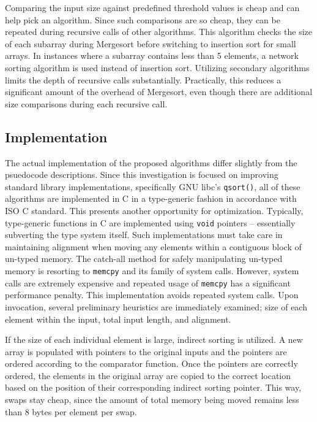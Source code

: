 \documentclass[12pt, conference]{ieeeconf}
\begin{document}
Comparing the input size against predefined threshold values is cheap and can
help pick an algorithm. Since such comparisons are so cheap, they can be
repeated during recursive calls of other algorithms. This algorithm checks the
size of each subarray during Mergesort before switching to insertion sort for
small arrays. In instances where a subarray contains less than 5 elements, a
network sorting algorithm is used instead of insertion sort. Utilizing secondary
algorithms limits the depth of recursive calls substantially. Practically, this
reduces a significant amount of the overhead of Mergesort, even though there are
additional size comparisons during each recursive
call\parencite{the_basic_algorithms}.

\subsection{Implementation}

The actual implementation of the proposed algorithms differ slightly from the
psuedocode descriptions. Since this investigation is focused on improving
standard library implementations, specifically GNU libc's \verb|qsort()|, all of
these algorithms are implemented in C in a type-generic fashion in accordance
with ISO C standard\parencite{iso_c}. This presents another opportunity for
optimization. Typically, type-generic functions in C are implemented using
\verb|void| pointers -- essentially subverting the type system itself. Such
implementations must take care in maintaining alignment when moving any elements
within a contiguous block of un-typed memory. The catch-all method for safely
manipulating un-typed memory is resorting to \verb|memcpy| and its family of
system calls. However, system calls are extremely expensive and repeated usage
of \verb|memcpy| has a significant performance penalty. This implementation
avoids repeated system calls. Upon invocation, several preliminary heuristics
are immediately examined; size of each element within the input, total input
length, and alignment.

If the size of each individual element is large, indirect sorting is utilized. A
new array is populated with pointers to the original inputs and the pointers are
ordered according to the comparator function. Once the pointers are correctly
ordered, the elements in the original array are copied to the correct location
based on the position of their corresponding indirect sorting pointer. This way,
swaps stay cheap, since the amount of total memory being moved remains less than
8 bytes per element per swap.
\end{document}
